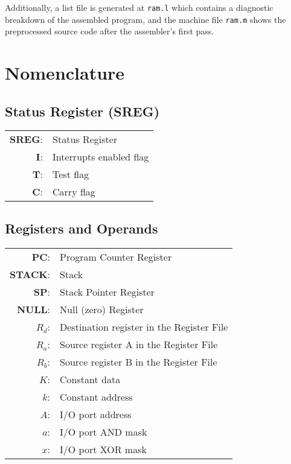 \documentclass[12pt,twoside]{report}
\begin{document}
\noindent
Additionally, a list file is generated at \texttt{ram.l} which
contains a diagnostic breakdown of the assembled program, and the
machine file \texttt{ram.m} shows the preprocessed source code after
the assembler's first pass.

\section{Nomenclature}

\subsection{Status Register (SREG)}

\begin{tabular}{ | r | l | }
  \hline
  \textbf{SREG}: & Status Register \\
  \textbf{I}: & Interrupts enabled flag \\
  \textbf{T}: & Test flag \\
  \textbf{C}: & Carry flag \\
  \hline
\end{tabular}

\subsection{Registers and Operands}

\begin{tabular}{ | r | l | }
  \hline
  \textbf{PC}: & Program Counter Register \\
  \textbf{STACK}: & Stack \\
  \textbf{SP}: & Stack Pointer Register \\
  \textbf{NULL}: & Null (zero) Register \\
  \textbf{$R_d$}: & Destination register in the Register File \\
  \textbf{$R_a$}: & Source register A in the Register File \\
  \textbf{$R_b$}: & Source register B in the Register File \\
  \textbf{$K$}: & Constant data \\
  \textbf{$k$}: & Constant address \\
  \textbf{$A$}: & I/O port address \\
  \textbf{$a$}: & I/O port AND mask \\
  \textbf{$x$}: & I/O port XOR mask \\
  \hline
\end{tabular}
\end{document}
